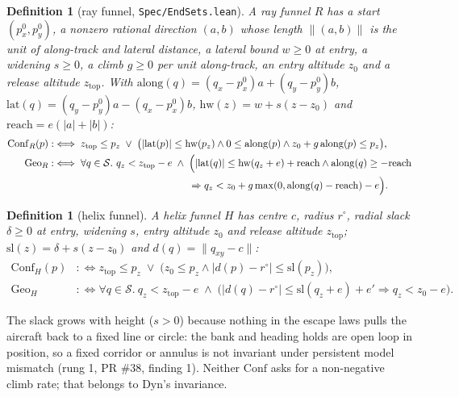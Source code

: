 \documentclass[11pt]{article}
\newtheorem{definition}[theorem]{Definition}
\newcommand{\Solid}{\mathcal{S}}
\newcommand{\Conf}{\ensuremath{\mathrm{Conf}}}
\newcommand{\Geo}{\ensuremath{\mathrm{Geo}}}
\newcommand{\Dyn}{\ensuremath{\mathrm{Dyn}}}
\newcommand{\zTop}{z_{\mathrm{top}}}
\begin{document}
\begin{definition}[ray funnel, \texttt{Spec/EndSets.lean}]\label{def:ray}
A ray funnel $R$ has a start $(p_x^0, p_y^0)$, a nonzero rational direction $(a, b)$ whose length $\|(a,b)\|$ is the unit of along-track and lateral distance, a lateral bound $w \ge 0$ at entry, a widening $s \ge 0$, a climb $g \ge 0$ per unit along-track, an entry altitude $z_0$ and a release altitude $\zTop$. With $\mathrm{along}(q) = (q_x - p_x^0) a + (q_y - p_y^0) b$, $\mathrm{lat}(q) = (q_y - p_y^0) a - (q_x - p_x^0) b$, $\mathrm{hw}(z) = w + s(z - z_0)$ and $\mathrm{reach} = e(|a| + |b|)$:
\begin{align*}
\Conf_R(p) &:\iff \zTop \le p_z \;\vee\; \bigl(|\mathrm{lat}(p)| \le \mathrm{hw}(p_z) \wedge 0 \le \mathrm{along}(p) \wedge z_0 + g\,\mathrm{along}(p) \le p_z\bigr),\\
\Geo_R &:\iff \forall q \in \Solid.\ q_z < \zTop - e \;\wedge\; \Bigl(|\mathrm{lat}(q)| \le \mathrm{hw}(q_z + e) + \mathrm{reach} \wedge \mathrm{along}(q) \ge -\mathrm{reach}\\
&\hspace{14em} \Rightarrow q_z < z_0 + g \max(0, \mathrm{along}(q) - \mathrm{reach}) - e\Bigr).
\end{align*}
\end{definition}

\begin{definition}[helix funnel]\label{def:helix}
A helix funnel $H$ has centre $c$, radius $r^\circ$, radial slack $\delta \ge 0$ at entry, widening $s$, entry altitude $z_0$ and release altitude $\zTop$; $\mathrm{sl}(z) = \delta + s(z - z_0)$ and $d(q) = \|q_{xy} - c\|$:
\begin{align*}
\Conf_H(p) &:\iff \zTop \le p_z \;\vee\; \bigl(z_0 \le p_z \wedge |d(p) - r^\circ| \le \mathrm{sl}(p_z)\bigr),\\
\Geo_H &:\iff \forall q \in \Solid.\ q_z < \zTop - e \;\wedge\; \bigl(|d(q) - r^\circ| \le \mathrm{sl}(q_z + e) + e' \Rightarrow q_z < z_0 - e\bigr).
\end{align*}
\end{definition}

The slack grows with height ($s > 0$) because nothing in the escape laws pulls the aircraft back to a fixed line or circle: the bank and heading holds are open loop in position, so a fixed corridor or annulus is not invariant under persistent model mismatch (rung 1, PR \#38, finding 1). Neither $\Conf$ asks for a non-negative climb rate; that belongs to $\Dyn$'s invariance.
\end{document}
